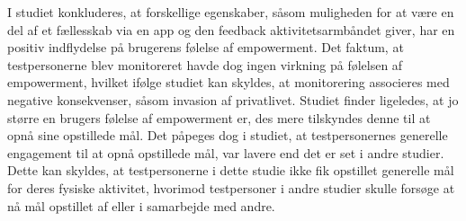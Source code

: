 I studiet konkluderes, at forskellige egenskaber, såsom muligheden for at være en del af et fællesskab via en app og den feedback aktivitetsarmbåndet giver, har en positiv indflydelse på brugerens følelse af empowerment. Det faktum, at testpersonerne blev monitoreret havde dog ingen virkning på følelsen af empowerment, hvilket ifølge studiet kan skyldes, at monitorering associeres med negative konsekvenser, såsom invasion af privatlivet.
Studiet finder ligeledes, at jo større en brugers følelse af empowerment er, des mere tilskyndes denne til at opnå sine opstillede mål. Det påpeges dog i studiet, at testpersonernes generelle engagement til at opnå opstillede mål, var lavere end det er set i andre studier. Dette kan skyldes, at testpersonerne i dette studie ikke fik opstillet generelle mål for deres fysiske aktivitet, hvorimod testpersoner i andre studier skulle forsøge at nå mål opstillet af eller i samarbejde med andre. 


